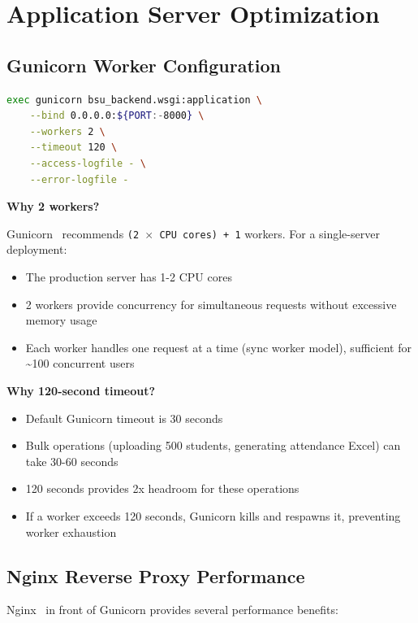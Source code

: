 \section{Application Server Optimization}
\label{sec:server-optimization}

\subsection{Gunicorn Worker Configuration}

\begin{lstlisting}[language=bash, caption=Gunicorn Production Configuration]
exec gunicorn bsu_backend.wsgi:application \
    --bind 0.0.0.0:${PORT:-8000} \
    --workers 2 \
    --timeout 120 \
    --access-logfile - \
    --error-logfile -
\end{lstlisting}

\textbf{Why 2 workers?}

Gunicorn~\cite{gunicorn} recommends \texttt{(2 $\times$ CPU cores) + 1} workers. For a single-server deployment:
\begin{itemize}
    \item The production server has 1-2 CPU cores
    \item 2 workers provide concurrency for simultaneous requests without excessive memory usage
    \item Each worker handles one request at a time (sync worker model), sufficient for \textasciitilde100 concurrent users
\end{itemize}

\textbf{Why 120-second timeout?}
\begin{itemize}
    \item Default Gunicorn timeout is 30 seconds
    \item Bulk operations (uploading 500 students, generating attendance Excel) can take 30-60 seconds
    \item 120 seconds provides 2x headroom for these operations
    \item If a worker exceeds 120 seconds, Gunicorn kills and respawns it, preventing worker exhaustion
\end{itemize}

\subsection{Nginx Reverse Proxy Performance}

Nginx~\cite{nginx} in front of Gunicorn provides several performance benefits:

